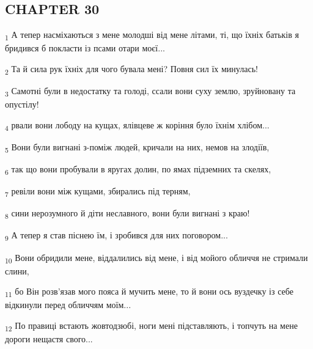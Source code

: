 \subsection{CHAPTER 30}
\begin{tcolorbox}
\textsubscript{1} А тепер насміхаються з мене молодші від мене літами, ті, що їхніх батьків я бридився б покласти із псами отари моєї...
\end{tcolorbox}
\begin{tcolorbox}
\textsubscript{2} Та й сила рук їхніх для чого бувала мені? Повня сил їх минулась!
\end{tcolorbox}
\begin{tcolorbox}
\textsubscript{3} Самотні були в недостатку та голоді, ссали вони суху землю, зруйновану та опустілу!
\end{tcolorbox}
\begin{tcolorbox}
\textsubscript{4} рвали вони лободу на кущах, ялівцеве ж коріння було їхнім хлібом...
\end{tcolorbox}
\begin{tcolorbox}
\textsubscript{5} Вони були вигнані з-поміж людей, кричали на них, немов на злодіїв,
\end{tcolorbox}
\begin{tcolorbox}
\textsubscript{6} так що вони пробували в яругах долин, по ямах підземних та скелях,
\end{tcolorbox}
\begin{tcolorbox}
\textsubscript{7} ревіли вони між кущами, збирались під терням,
\end{tcolorbox}
\begin{tcolorbox}
\textsubscript{8} сини нерозумного й діти неславного, вони були вигнані з краю!
\end{tcolorbox}
\begin{tcolorbox}
\textsubscript{9} А тепер я став піснею їм, і зробився для них поговором...
\end{tcolorbox}
\begin{tcolorbox}
\textsubscript{10} Вони обридили мене, віддалились від мене, і від мойого обличчя не стримали слини,
\end{tcolorbox}
\begin{tcolorbox}
\textsubscript{11} бо Він розв'язав мого пояса й мучить мене, то й вони ось вуздечку із себе відкинули перед обличчям моїм...
\end{tcolorbox}
\begin{tcolorbox}
\textsubscript{12} По правиці встають жовтодзюбі, ноги мені підставляють, і топчуть на мене дороги нещастя свого...
\end{tcolorbox}

